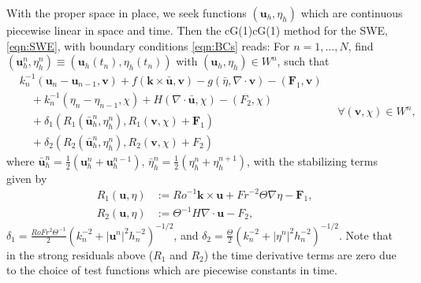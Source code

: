 With the proper space in place, we seek functions $(\mathbf{u}_h, \eta_h)$ which
are continuous piecewise linear in space and time. Then the cG(1)cG(1) method
for the SWE, \eqref{eqn:SWE}, with boundary conditions \eqref{eqn:BCs} reads:
For $n = 1, \dots, N$, find $(\mathbf{u}_h^n, \eta_h^n) \equiv
(\mathbf{u}_h(t_n), \eta_h(t_n))$ with $(\mathbf{u}_h, \eta_h) \in W^n$, such
that
\begin{equation}
  \begin{split}
    &k_n^{-1}(\mathbf{u}_n - \mathbf{u}_{n-1}, \mathbf{v}) + f(\mathbf{k} \times
        \bar{\mathbf{u}}, \mathbf{v}) - g (\bar{\eta}, \nabla\cdot \mathbf{v}) -
        (\mathbf{F}_1,\mathbf{v}) \\
    &\quad+ k_n^{-1}(\eta_n - \eta_{n-1}, \chi) + H (\nabla\cdot
      \bar{\mathbf{u}},\chi) - (F_2,\chi)\\
    &\quad+ \delta_1 ( R_1(\bar{\mathbf{u}}_h^n, \eta_h^n),
      R_1(\mathbf{v}, \chi) + \mathbf{F}_1) \\
    &\quad+ \delta_2 (R_2(\bar{\mathbf{u}}_h^n, \eta_h^n),
        R_2(\mathbf{v}, \chi) + F_2)
  \end{split}
  \quad \forall (\mathbf{v},\chi) \in W^n,
  \label{eqn:cG1cG1}
\end{equation}
where $\bar{\mathbf{u}}_h^n = \frac{1}{2}(\mathbf{u}_h^n + \mathbf{u}_h^{n-1}),\,
\bar{\eta}_h^n = \frac{1}{2}(\eta_h^n + \eta_h^{n+1})$, with the stabilizing
terms given by
\begin{align*}
  R_1(\mathbf{u},\eta) &:= Ro^{-1}\mathbf{k} \times \mathbf{u} 
    + Fr^{-2} \Theta \nabla \eta - \mathbf{F}_1, \\
  R_2(\mathbf{u},\eta) &:= \Theta^{-1} H \nabla\cdot \mathbf{u} - F_2,
\end{align*}
$\delta_1 = \frac{RoFr^2\Theta^{-1}}{2}(k_n^{-2} + |\mathbf{u}^n|^2 h_n^{-2})^{-1/2}$, and
$\delta_2 = \frac{\Theta}{2}(k_n^{-2} + |\eta^n|^2 h_n^{-2})^{-1/2}$. Note that in
the strong residuals above ($R_1$ and $R_2$) the time derivative terms are zero
due to the choice of test functions which are piecewise constants in time.
